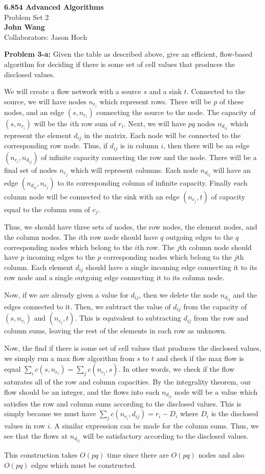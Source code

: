 \documentclass[psamsfonts]{amsart}
\newenvironment{sol}{\vspace{0.25cm}{\large \bfseries Solution:}}{\qedsymbol}
\newenvironment{prob}[1]{\begin{framed}{\large \bfseries Problem #1:}}{\end{framed}}
\newcommand{\makenewtitle}{
    \begin{center}
    {\huge \bfseries 6.854 Advanced Algorithms} \\
    Problem Set 2\\
    \vspace{0.25cm}
    {\bfseries John Wang} \\
    Collaborators: Jason Hoch
    \end{center}
    \vspace{0.5cm}
}
\begin{document}
\newpage
\makenewtitle
\begin{prob}{3-a}
Given the table as described above, give an efficient, flow-based algorithm for deciding if there is some set of cell values that produces the disclosed values.
\end{prob}
\begin{sol}
We will create a flow network with a source $s$ and a sink $t$. Connected to the source, we will have nodes $n_{r_i}$ which represent rows. There will be $p$ of these nodes, and an edge $(s,n_{r_i})$ connecting the source to the node. The capacity of $(s,n_{r_i})$ will be the $i$th row sum of $r_i$. Next, we will have $pq$ nodes $n_{d_{ij}}$ which represent the element $d_{ij}$ in the matrix. Each node will be connected to the corresponding row node. Thus, if $d_{ij}$ is in column $i$, then there will be an edge $(n_{r_i}, n_{d_{ij}})$ of infinite capacity connecting the row and the node. There will be a final set of nodes $n_{c_{j}}$ which will represent columns. Each node $n_{d_{ij}}$ will have an edge $(n_{d_{ij}}, n_{c_j})$ to its corresponding column of infinite capacity. Finally each column node will be connected to the sink with an edge $(n_{c_j}, t)$ of capacity equal to the column sum of $c_j$. 

Thus, we should have three sets of nodes, the row nodes, the element nodes, and the column nodes. The $i$th row node should have $q$ outgoing edges to the $q$ corresponding nodes which belong to the $i$th row. The $j$th column node should have $p$ incoming edges to the $p$ corresponding nodes which belong to the $j$th column. Each element $d_{ij}$ should have a single incoming edge connecting it to its row node and a single outgoing edge connecting it to its column node. 

Now, if we are already given a value for $d_{ij}$, then we delete the node $n_{d_{ij}}$ and the edges connected to it. Then, we subtract the value of $d_{ij}$ from the capacity of $(s, n_{r_i})$ and $(n_{c_j}, t)$. This is equivalent to subtracting $d_{ij}$ from the row and column sums, leaving the rest of the elements in each row as unknown.

Now, the find if there is some set of cell values that produces the disclosed values, we simply run a max flow algorithm from $s$ to $t$ and check if the max flow is equal $\sum_{i} c(s, n_{r_i}) = \sum_j c(n_{c_j}, s)$. In other words, we check if the flow saturates all of the row and column capacities. By the integrality theorem, our flow should be an integer, and the flows into each $n_{d_{ij}}$ node will be a value which satisfies the row and column sums according to the disclosed values. This is simply because we must have $\sum_{j} c(n_{r_i}, d_{ij}) = r_i - D_i$ where $D_i$ is the disclosed values in row $i$. A similar expression can be made for the column sums. Thus, we see that the flows at $n_{d_{ij}}$ will be satisfactory according to the disclosed values. 

This construction takes $O(pq)$ time since there are $O(pq)$ nodes and also $O(pq)$ edges which must be constructed. 
\end{sol}
\end{document}
